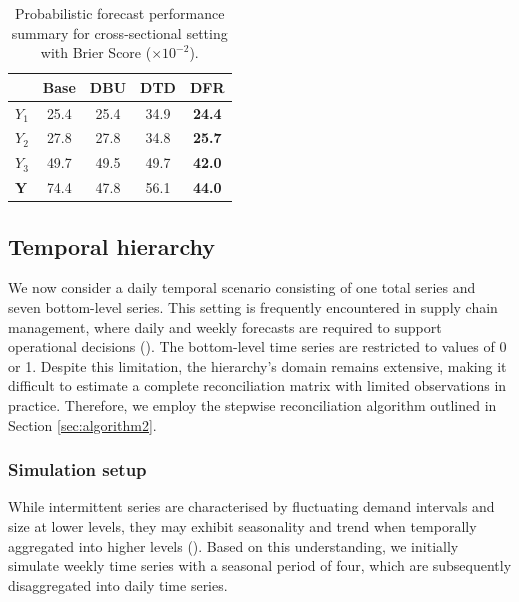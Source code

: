 \documentclass[a4paper,review,12pt,authoryear]{elsarticle}
\newcommand{\bY}{\mathbf{Y}}
\theoremstyle{definition}
\begin{document}
    \begin{table}
      \centering
      \caption{\label{tab:sim_crosssectional_res_dist} Probabilistic forecast performance summary for cross-sectional setting with Brier Score ($\times 10^{-2}$).}
      \begin{tabular}{lcccc}
      \toprule
      & Base & DBU & DTD & DFR \\\midrule
      $Y_1$ & 25.4 & 25.4 & 34.9 & \textbf{24.4} \\
      $Y_2$ & 27.8 & 27.8 & 34.8 & \textbf{25.7}\\
      $Y_3$ & 49.7 & 49.5 & 49.7 & \textbf{42.0} \\
      $\bY$ & 74.4 & 47.8 & 56.1 & \textbf{44.0} \\
      \bottomrule
      \end{tabular}
    \end{table}


     \subsection{Temporal hierarchy}

     We now consider a daily temporal scenario consisting of one total series and seven bottom-level series.
     This setting is frequently encountered in supply chain management, where daily and weekly forecasts are required to support operational decisions (\citealp{syntetosSupplyChainForecasting2016}).
     The bottom-level time series are restricted to values of 0 or 1.
     Despite this limitation, the hierarchy's domain remains extensive, making it difficult to estimate a complete reconciliation matrix with limited observations in practice.
     Therefore, we employ the stepwise reconciliation algorithm outlined in Section \ref{sec:algorithm2}.

     \subsubsection{Simulation setup}

     While intermittent series are characterised by fluctuating demand intervals and size at lower levels, they may exhibit seasonality and trend when temporally aggregated into higher levels ().
     Based on this understanding, we initially simulate weekly time series with a seasonal period of four, which are subsequently disaggregated into daily time series.
\end{document}
